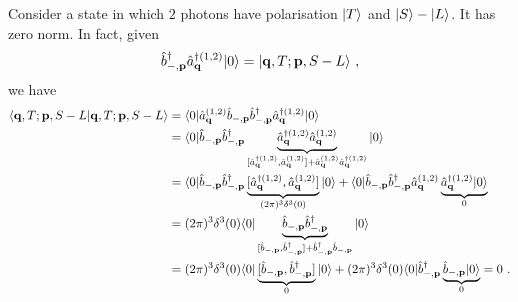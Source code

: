     \begin{example}
        Consider a state in which $2$ photons have polarisation $\vert T\rangle$ and $\vert S\rangle - \vert L\rangle$. It has zero norm. In fact, given
        \begin{equation*}
            \hat b_{-, \mathbf p}^\dagger \hat a_{\mathbf q}^{\dagger (1,2)} \vert0\rangle = \vert\mathbf q, T; \mathbf p, S-L\rangle ~,
        \end{equation*}
        we have 
        \begin{equation*}
        \begin{aligned}
            \langle\mathbf q, T; \mathbf p, S-L\vert\mathbf q, T; \mathbf p, S-L\rangle & = \langle0\vert \hat a_{\mathbf q}^{(1,2)} \hat b_{-, \mathbf p} \hat b_{-, \mathbf p}^\dagger \hat a_{\mathbf q}^{\dagger (1,2)} \vert0\rangle \\ & = \langle0\vert \hat b_{-, \mathbf p} \hat b_{-, \mathbf p}^\dagger \underbrace{\hat a_{\mathbf q}^{\dagger (1,2)} \hat a_{\mathbf q}^{(1,2)}}_{[\hat a_{\mathbf q}^{\dagger (1,2)} , \hat a_{\mathbf q}^{(1,2)}] + \hat a_{\mathbf q}^{(1,2)} \hat a_{\mathbf q}^{\dagger (1,2)}} \vert0\rangle \\ & = \langle0\vert \hat b_{-, \mathbf p} \hat b_{-, \mathbf p}^\dagger \underbrace{[\hat a_{\mathbf q}^{\dagger (1,2)} , \hat a_{\mathbf q}^{(1,2)}] }_{(2\pi)^3 \delta^3 (0) } \vert0\rangle + \langle0\vert \hat b_{-, \mathbf p} \hat b_{-, \mathbf p}^\dagger \hat a_{\mathbf q}^{(1,2)} \underbrace{\hat a_{\mathbf q}^{\dagger (1,2)} \vert0\rangle}_0 \\ & = (2\pi)^3 \delta^3 (0) \langle0\vert \underbrace{\hat b_{-, \mathbf p} \hat b_{-, \mathbf p}^\dagger}_{[\hat b_{-, \mathbf p} , \hat b_{-, \mathbf p}^\dagger] + \hat b_{-, \mathbf p}^\dagger \hat b_{-, \mathbf p}} \vert0\rangle \\ & = (2\pi)^3 \delta^3 (0) \langle0\vert \underbrace{[\hat b_{-, \mathbf p} , \hat b_{-, \mathbf p}^\dagger]}_0 \vert0\rangle + (2\pi)^3 \delta^3 (0) \langle0\vert \hat b_{-, \mathbf p}^\dagger \underbrace{\hat b_{-, \mathbf p} \vert0\rangle}_0 = 0 ~.
        \end{aligned}
        \end{equation*}
    \end{example}
    
